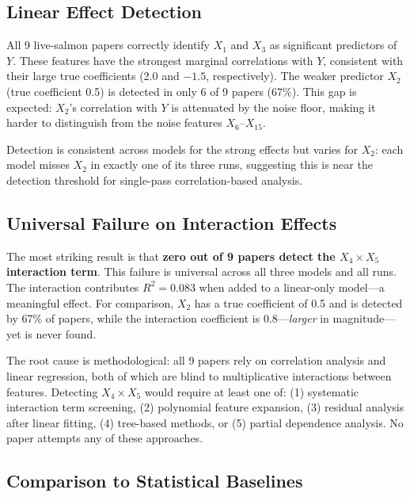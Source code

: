 \subsection{Linear Effect Detection}
\label{sec:linear}

All 9 live-salmon papers correctly identify $X_1$ and $X_3$ as significant predictors of $Y$.
These features have the strongest marginal correlations with $Y$, consistent with their large true coefficients (2.0 and $-1.5$, respectively).
The weaker predictor $X_2$ (true coefficient 0.5) is detected in only 6 of 9 papers (67\%).
This gap is expected: $X_2$'s correlation with $Y$ is attenuated by the noise floor, making it harder to distinguish from the noise features $X_6$--$X_{15}$.

Detection is consistent across models for the strong effects but varies for $X_2$: each model misses $X_2$ in exactly one of its three runs, suggesting this is near the detection threshold for single-pass correlation-based analysis.

\subsection{Universal Failure on Interaction Effects}
\label{sec:interaction}

The most striking result is that \textbf{zero out of 9 papers detect the $X_4 \times X_5$ interaction term}.
This failure is universal across all three models and all runs.
The interaction contributes $R^2 = 0.083$ when added to a linear-only model---a meaningful effect.
For comparison, $X_2$ has a true coefficient of 0.5 and is detected by 67\% of papers, while the interaction coefficient is 0.8---\textit{larger} in magnitude---yet is never found.

The root cause is methodological: all 9 papers rely on correlation analysis and linear regression, both of which are blind to multiplicative interactions between features.
Detecting $X_4 \times X_5$ would require at least one of: (1) systematic interaction term screening, (2) polynomial feature expansion, (3) residual analysis after linear fitting, (4) tree-based methods, or (5) partial dependence analysis.
No paper attempts any of these approaches.

\subsection{Comparison to Statistical Baselines}
\label{sec:baselines}

